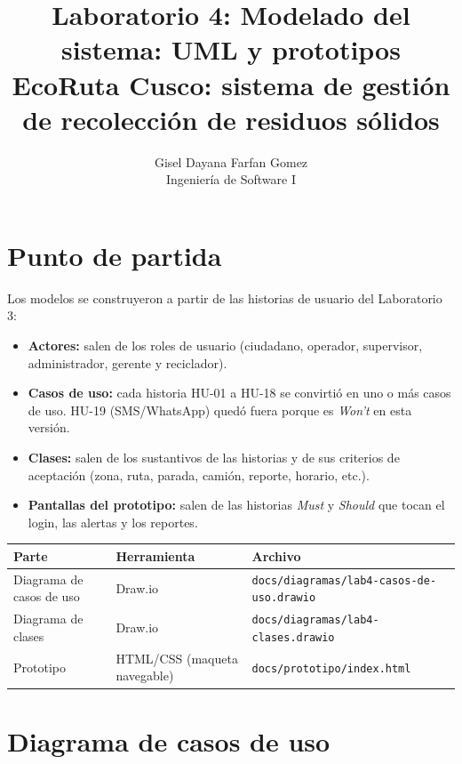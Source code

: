 \documentclass[11pt,a4paper]{article}
\title{\textbf{Laboratorio 4: Modelado del sistema: UML y prototipos}\\[0.4em]
\large EcoRuta Cusco: sistema de gestión de recolección de residuos sólidos}
\author{Gisel Dayana Farfan Gomez\\ Ingeniería de Software I}
\date{}
\begin{document}
\maketitle

\section{Punto de partida}

Los modelos se construyeron a partir de las historias de usuario del Laboratorio 3:

\begin{itemize}
  \item \textbf{Actores:} salen de los roles de usuario (ciudadano, operador, supervisor, administrador, gerente y reciclador).
  \item \textbf{Casos de uso:} cada historia HU-01 a HU-18 se convirtió en uno o más casos de uso. HU-19 (SMS/WhatsApp) quedó fuera porque es \textit{Won't} en esta versión.
  \item \textbf{Clases:} salen de los sustantivos de las historias y de sus criterios de aceptación (zona, ruta, parada, camión, reporte, horario, etc.).
  \item \textbf{Pantallas del prototipo:} salen de las historias \textit{Must} y \textit{Should} que tocan el login, las alertas y los reportes.
\end{itemize}

\begin{center}
\small
\begin{tabular}{L{3.6cm} L{3.4cm} L{8cm}}
\toprule
\textbf{Parte} & \textbf{Herramienta} & \textbf{Archivo} \\
\midrule
Diagrama de casos de uso & Draw.io & \texttt{docs/diagramas/lab4-casos-de-uso.drawio} \\
Diagrama de clases & Draw.io & \texttt{docs/diagramas/lab4-clases.drawio} \\
Prototipo & HTML/CSS (maqueta navegable) & \texttt{docs/prototipo/index.html} \\
\bottomrule
\end{tabular}
\end{center}

\section{Diagrama de casos de uso}
\end{document}
